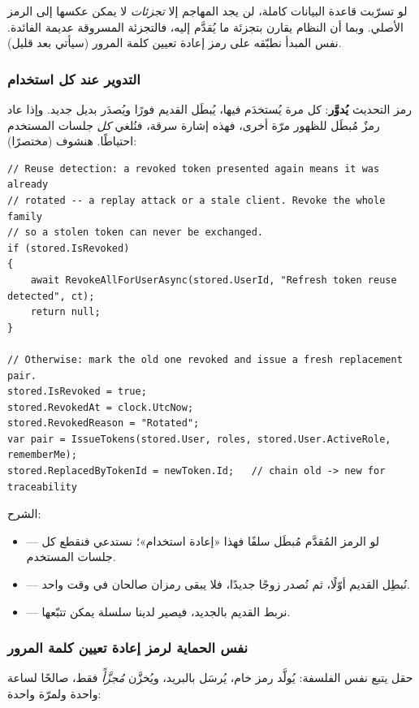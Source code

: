 \begin{keyp}
لو تسرّبت قاعدة البيانات كاملة، لن يجد المهاجم إلا \emph{تجزئات} لا يمكن عكسها إلى
الرمز الأصلي. وبما أن النظام يقارن بتجزئة ما يُقدَّم إليه، فالتجزئة المسروقة عديمة
الفائدة. نفس المبدأ نطبّقه على رمز إعادة تعيين كلمة المرور (سيأتي بعد قليل).
\end{keyp}

\subsubsection{التدوير عند كل استخدام}
رمز التحديث \textbf{يُدوَّر}: كل مرة يُستخدَم فيها، يُبطَل القديم فورًا ويُصدَر بديل
جديد. وإذا عاد رمزٌ مُبطَل للظهور مرّة أخرى، فهذه إشارة سرقة، فنُلغي \emph{كل} جلسات
المستخدم احتياطًا. هنشوف  (مختصرًا):

\begin{english}
\begin{lstlisting}[language={[Sharp]C}]
// Reuse detection: a revoked token presented again means it was already
// rotated -- a replay attack or a stale client. Revoke the whole family
// so a stolen token can never be exchanged.
if (stored.IsRevoked)
{
    await RevokeAllForUserAsync(stored.UserId, "Refresh token reuse detected", ct);
    return null;
}

// Otherwise: mark the old one revoked and issue a fresh replacement pair.
stored.IsRevoked = true;
stored.RevokedAt = clock.UtcNow;
stored.RevokedReason = "Rotated";
var pair = IssueTokens(stored.User, roles, stored.User.ActiveRole, rememberMe);
stored.ReplacedByTokenId = newToken.Id;   // chain old -> new for traceability
\end{lstlisting}
\end{english}

الشرح:
\begin{itemize}
\item {} — لو الرمز المُقدَّم مُبطَل سلفًا فهذا «إعادة
  استخدام»؛ نستدعي  فنقطع كل جلسات المستخدم.
\item {} — نُبطِل القديم أوّلًا، ثم نُصدر زوجًا جديدًا،
  فلا يبقى رمزان صالحان في وقت واحد.
\item {} — نربط القديم بالجديد، فيصير لدينا سلسلة يمكن تتبّعها.
\end{itemize}

\subsubsection{نفس الحماية لرمز إعادة تعيين كلمة المرور}
حقل  يتبع نفس الفلسفة: يُولَّد رمز خام، يُرسَل
بالبريد، ويُخزَّن \emph{مُجزَّأً} فقط، صالحًا لساعة واحدة ولمرّة واحدة:

